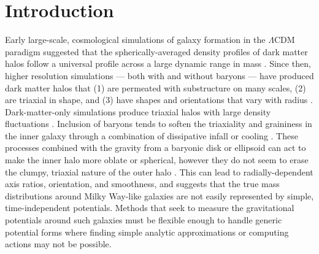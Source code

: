 \documentclass[letterpaper,12pt,preprint]{aastex}
\begin{document}

\section{Introduction}\label{sec:intro}

Early large-scale, cosmological simulations of galaxy formation in the $\Lambda$CDM paradigm suggested that the spherically-averaged density profiles of dark matter halos follow a universal profile across a large dynamic range in mass \citep{navarro96}. Since then, higher resolution simulations --- both with and without baryons --- have produced dark matter halos that (1) are permeated with substructure on many scales, (2) are triaxial in shape, and (3) have shapes and orientations that vary with radius \citep{dubinski91, jing02, kuhlen07, veraciro11}. Dark-matter-only simulations produce triaxial halos \citep{jing02} with large density fluctuations \citep{zemp09}. Inclusion of baryons tends to soften the triaxiality and graininess in the inner galaxy through a combination of dissipative infall \citep{dubinski94} or cooling \citep{bryan13}. These processes combined with the gravity from a baryonic disk or ellipsoid can act to make the inner halo more oblate or spherical, however they do not seem to erase the clumpy, triaxial nature of the outer halo \citep[e.g.,][]{pontzen12}. This can lead to radially-dependent axis ratios, orientation, and smoothness, and suggests that the true mass distributions around Milky Way-like galaxies are not easily represented by simple, time-independent potentials. Methods that seek to measure the gravitational potentials around such galaxies must be flexible enough to handle generic potential forms where finding simple analytic approximations or computing actions may not be possible.
\end{document}
